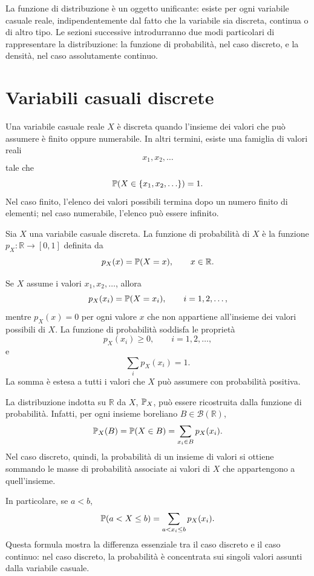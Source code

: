 La funzione di distribuzione \`{e} un oggetto unificante: esiste per ogni
variabile casuale reale, indipendentemente dal fatto che la variabile sia
discreta, continua o di altro tipo. Le sezioni successive introdurranno due modi
particolari di rappresentare la distribuzione: la funzione di probabilit\`{a}, nel caso
discreto, e la densit\`{a}, nel caso assolutamente continuo.

\section{Variabili casuali discrete}
\label{sec:cap2-vc-discrete}

Una variabile casuale reale $X$ \`{e} discreta quando l'insieme dei valori che
pu\`{o} assumere \`{e} finito oppure numerabile. In altri termini, esiste una
famiglia di valori reali
\[
x_1,x_2,\ldots
\]
tale che
\[
\mathbb{P}(X\in\{x_1,x_2,\ldots\})=1.
\]
Nel caso finito, l'elenco dei valori possibili termina dopo un numero finito di
elementi; nel caso numerabile, l'elenco pu\`{o} essere infinito.

\begin{definition}
Sia $X$ una variabile casuale discreta. La funzione di probabilit\`{a} di $X$ \`{e} la funzione $p_X:\mathbb{R}\to[0,1]$ definita da
\[
p_X(x)=\mathbb{P}(X=x),
\qquad x\in\mathbb{R}.
\]
\end{definition}

Se $X$ assume i valori $x_1,x_2,\ldots$, allora
\[
p_X(x_i)=\mathbb{P}(X=x_i),
\qquad i=1,2,\ldots,
\]
mentre $p_X(x)=0$ per ogni valore $x$ che non appartiene all'insieme dei valori
possibili di $X$. La funzione di probabilit\`{a} soddisfa le propriet\`{a}
\[
p_X(x_i)\geq 0,
\qquad i=1,2,\ldots,
\]
e
\[
\sum_i p_X(x_i)=1.
\]
La somma \`{e} estesa a tutti i valori che $X$ pu\`{o} assumere con probabilit\`{a}
positiva.

La distribuzione indotta su $\mathbb{R}$ da $X$, $\mathbb{P}_X$, pu\`{o} essere ricostruita dalla funzione di
probabilit\`{a}. Infatti, per ogni insieme boreliano $B\in\mathcal{B}(\mathbb{R})$,
\[
\mathbb{P}_X(B)
=
\mathbb{P}(X\in B)
=
\sum_{x_i\in B} p_X(x_i).
\]
Nel caso discreto, quindi, la probabilit\`{a} di un insieme di valori si ottiene
sommando le masse di probabilit\`{a} associate ai valori di $X$ che appartengono
a quell'insieme.

In particolare, se $a<b$,
\[
\mathbb{P}(a<X\leq b)
=
\sum_{a<x_i\leq b}p_X(x_i).
\]
Questa formula mostra la differenza essenziale tra il caso discreto e il caso
continuo: nel caso discreto, la probabilit\`{a} \`{e} concentrata sui singoli valori
assunti dalla variabile casuale.

